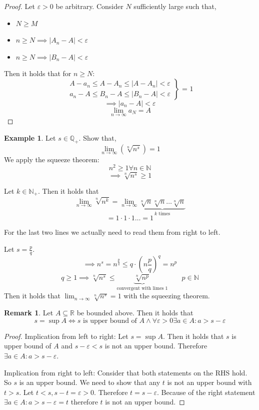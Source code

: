 \documentclass[a4paper,landscape,twocolumn]{article}
\theoremstyle{definition}
\newtheorem{rem}{Remark}
\newtheorem{ex}{Example}
\newcommand\abs[1]{\left|#1\right|}
\begin{document}
\begin{proof}
  Let $\varepsilon > 0$ be arbitrary.
  Consider $N$ sufficiently large such that,
  \begin{itemize}
    \item $N \geq M$
    \item $n \geq N \implies \abs{A_n - A} < \varepsilon$
    \item $n \geq N \implies \abs{B_n - A} < \varepsilon$
  \end{itemize}
  Then it holds that for $n \geq N$:
  \[
    \left.\begin{array}{c}
      A - a_n \leq A - A_n \leq \abs{A - A_n} < \varepsilon \\
      a_n - A \leq B_n - A \leq \abs{B_n - A} < \varepsilon
    \end{array}\right\} \text{ = 1}
  \] \[
    \implies \abs{a_n - A} < \varepsilon
  \] \[
    \lim_{n \to \infty} a_N = A
  \]
\end{proof}

\begin{ex}
  Let $s \in \mathbb Q_+$. Show that,
  \[ \lim_{n \to \infty} \left(\sqrt[n]{n^s}\right) = 1 \]
  We apply the squeeze theorem:
  \[ n^2 \geq 1 \forall n \in \mathbb N \]
  \[ \implies \sqrt[n]{n^s} \geq 1 \]

  Let $k \in \mathbb N_+$. Then it holds that
  \[ \lim_{n \to \infty} \sqrt[n]{n^k} = \lim_{n \to \infty} \underbrace{\sqrt[n]{n} \sqrt[n]{n} \dots \sqrt[n]{n}}_{k \text { times}} \]
  \[ = 1 \cdot 1 \cdot 1 \dots = 1 \]

  For the last two lines we actually need to read them from right to left.

  Let $s = \frac pq$.
  \[ \implies n^s = n^{\frac pq} \leq q \cdot \left(n \frac{p}{q}\right)^q = n^p \]
  \[ q \geq 1 \implies \sqrt[n]{n^s}  \leq \underbrace{\sqrt[n]{n^p}}_{\text{convergent with limes }1} \qquad p \in \mathbb N \]
  Then it holds that $\lim_{n \to \infty} \sqrt[n]{n^s} = 1$ with the squeezing theorem.
\end{ex}

\begin{rem}
  Let $A \subseteq \mathbb R$ be bounded above. Then it holds that
  \[
      s = \sup{A}
      \iff
          s \text{ is upper bound of } A \land
          \forall \varepsilon > 0 \exists a \in A: a > s - \varepsilon
  \]
\end{rem}

\begin{proof}
  Implication from left to right:
  Let $s = \sup{A}$. Then it holds that $s$ is upper bound of $A$
  and $s - \varepsilon <  s$ is not an upper bound. Therefore $\exists a \in A: a > s - \varepsilon$.

  Implication from right to left:
  Consider that both statements on the RHS hold. So $s$ is an upper bound.
  We need to show that any $t$ is not an upper bound with $t > s$.
  Let $t < s, s - t = \varepsilon > 0$. Therefore $t = s - \varepsilon$.
  Because of the right statement $\exists a \in A: a > s - \varepsilon = t$ therefore $t$ is not an upper bound.
\end{proof}
\end{document}
